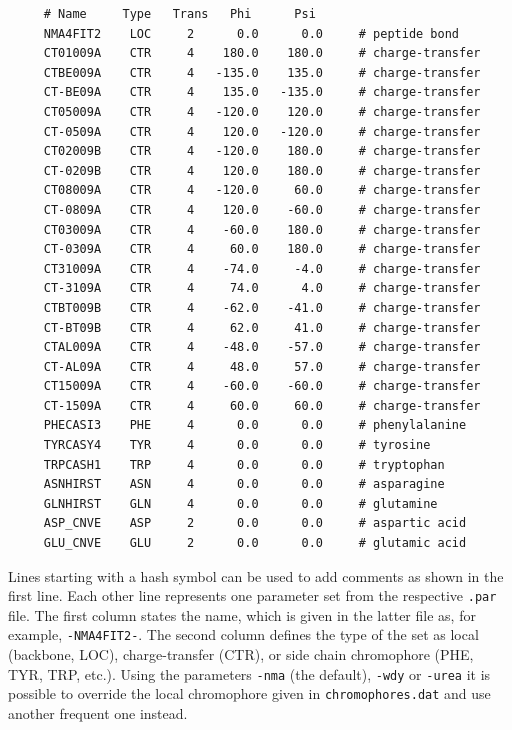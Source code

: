 \documentclass[11pt, letterpaper]{article}
\begin{document}
\label{Page:ChromophoresDat}
{\small
\begin{verbatim}
     # Name     Type   Trans   Phi      Psi
     NMA4FIT2    LOC     2      0.0      0.0     # peptide bond
     CT01009A    CTR     4    180.0    180.0     # charge-transfer
     CTBE009A    CTR     4   -135.0    135.0     # charge-transfer
     CT-BE09A    CTR     4    135.0   -135.0     # charge-transfer
     CT05009A    CTR     4   -120.0    120.0     # charge-transfer
     CT-0509A    CTR     4    120.0   -120.0     # charge-transfer
     CT02009B    CTR     4   -120.0    180.0     # charge-transfer
     CT-0209B    CTR     4    120.0    180.0     # charge-transfer
     CT08009A    CTR     4   -120.0     60.0     # charge-transfer
     CT-0809A    CTR     4    120.0    -60.0     # charge-transfer
     CT03009A    CTR     4    -60.0    180.0     # charge-transfer
     CT-0309A    CTR     4     60.0    180.0     # charge-transfer
     CT31009A    CTR     4    -74.0     -4.0     # charge-transfer
     CT-3109A    CTR     4     74.0      4.0     # charge-transfer
     CTBT009B    CTR     4    -62.0    -41.0     # charge-transfer
     CT-BT09B    CTR     4     62.0     41.0     # charge-transfer
     CTAL009A    CTR     4    -48.0    -57.0     # charge-transfer
     CT-AL09A    CTR     4     48.0     57.0     # charge-transfer
     CT15009A    CTR     4    -60.0    -60.0     # charge-transfer
     CT-1509A    CTR     4     60.0     60.0     # charge-transfer
     PHECASI3    PHE     4      0.0      0.0     # phenylalanine
     TYRCASY4    TYR     4      0.0      0.0     # tyrosine
     TRPCASH1    TRP     4      0.0      0.0     # tryptophan
     ASNHIRST    ASN     4      0.0      0.0     # asparagine
     GLNHIRST    GLN     4      0.0      0.0     # glutamine
     ASP_CNVE    ASP     2      0.0      0.0     # aspartic acid
     GLU_CNVE    GLU     2      0.0      0.0     # glutamic acid
\end{verbatim}
} %

Lines starting with a hash symbol can be used to add comments as shown in the first line. Each other line represents one parameter set from the respective \verb'.par' file. The first column states the name, which is given in the latter file as, for example, \verb'-NMA4FIT2-'. The second column defines the type of the set as local (backbone, LOC), charge-transfer (CTR), or side chain chromophore (PHE, TYR, TRP, etc.). Using the parameters \verb'-nma' (the default), \verb'-wdy' or \verb'-urea' it is possible to override the local chromophore given in \verb'chromophores.dat' and use another frequent one instead.
\end{document}

